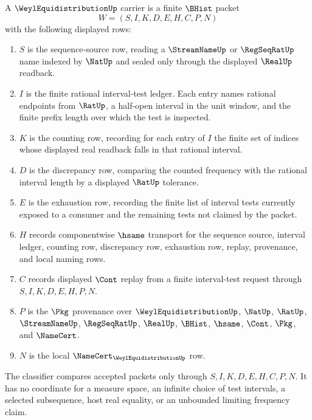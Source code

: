 \begin{definition}
\label{def:weyl-equidistribution-finite-carrier}
A $\WeylEquidistributionUp$ carrier is a finite $\BHist$ packet
$$
W=(S,I,K,D,E,H,C,P,N)
$$
with the following displayed rows:
\begin{enumerate}
\item $S$ is the sequence-source row, reading a $\StreamNameUp$ or $\RegSeqRatUp$ name indexed by $\NatUp$ and sealed only through the displayed $\RealUp$ readback.
\item $I$ is the finite rational interval-test ledger. Each entry names rational endpoints from $\RatUp$, a half-open interval in the unit window, and the finite prefix length over which the test is inspected.
\item $K$ is the counting row, recording for each entry of $I$ the finite set of indices whose displayed real readback falls in that rational interval.
\item $D$ is the discrepancy row, comparing the counted frequency with the rational interval length by a displayed $\RatUp$ tolerance.
\item $E$ is the exhaustion row, recording the finite list of interval tests currently exposed to a consumer and the remaining tests not claimed by the packet.
\item $H$ records componentwise $\hsame$ transport for the sequence source, interval ledger, counting row, discrepancy row, exhaustion row, replay, provenance, and local naming rows.
\item $C$ records displayed $\Cont$ replay from a finite interval-test request through $S,I,K,D,E,H,P,N$.
\item $P$ is the $\Pkg$ provenance over $\WeylEquidistributionUp$, $\NatUp$, $\RatUp$, $\StreamNameUp$, $\RegSeqRatUp$, $\RealUp$, $\BHist$, $\hsame$, $\Cont$, $\Pkg$, and $\NameCert$.
\item $N$ is the local $\NameCert_{\WeylEquidistributionUp}$ row.
\end{enumerate}
The classifier compares accepted packets only through $S,I,K,D,E,H,C,P,N$. It has no coordinate for a measure space, an infinite choice of test intervals, a selected subsequence, host real equality, or an unbounded limiting frequency claim.
\end{definition}

